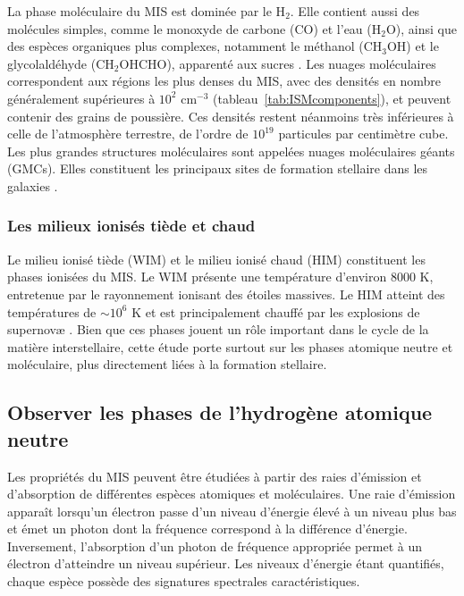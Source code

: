 La phase moléculaire du MIS est dominée par le H$_2$. Elle contient aussi des molécules simples, comme le monoxyde de carbone (CO) et l'eau (H$_2$O), ainsi que des espèces organiques plus complexes, notamment le méthanol (CH$_3$OH) et le glycolaldéhyde (CH$_2$OHCHO), apparenté aux sucres \citep{sugar2000}. Les nuages moléculaires correspondent aux régions les plus denses du MIS, avec des densités en nombre généralement supérieures à $10^2$ cm$^{-3}$ (tableau~\ref{tab:ISMcomponents}), et peuvent contenir des grains de poussière. Ces densités restent néanmoins très inférieures à celle de l'atmosphère terrestre, de l'ordre de $10^{19}$ particules par centimètre cube. Les plus grandes structures moléculaires sont appelées nuages moléculaires géants (GMCs). Elles constituent les principaux sites de formation stellaire dans les galaxies \citep{Klessen2016}.

\subsubsection{Les milieux ionisés tiède et chaud}

Le milieu ionisé tiède (WIM) et le milieu ionisé chaud (HIM) constituent les phases ionisées du MIS. Le WIM présente une température d'environ 8000 K, entretenue par le rayonnement ionisant des étoiles massives. Le HIM atteint des températures de $\sim 10^6$ K et est principalement chauffé par les explosions de supernovæ \citep{Ferriere_2001}. Bien que ces phases jouent un rôle important dans le cycle de la matière interstellaire, cette étude porte surtout sur les phases atomique neutre et moléculaire, plus directement liées à la formation stellaire.

\subsection{Observer les phases de l'hydrogène atomique neutre}
\label{subsec:tracing_methods}

Les propriétés du MIS peuvent être étudiées à partir des raies d'émission et d'absorption de différentes espèces atomiques et moléculaires. Une raie d'émission apparaît lorsqu'un électron passe d'un niveau d'énergie élevé à un niveau plus bas et émet un photon dont la fréquence correspond à la différence d'énergie. Inversement, l'absorption d'un photon de fréquence appropriée permet à un électron d'atteindre un niveau supérieur. Les niveaux d'énergie étant quantifiés, chaque espèce possède des signatures spectrales caractéristiques.

